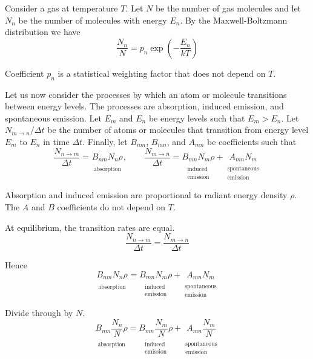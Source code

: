 \documentclass[12pt]{article}
\newcommand\BNM{B_{nm}} %
\newcommand\BMN{B_{mn}} %
\newcommand\AMN{A_{mn}} %
\newcommand\RHO{\rho}
\newcommand\ABSORPTION{\substack{\\[1ex] \text{absorption}}}
\newcommand\INDUCED{\substack{\\[1ex] \text{induced}\\ \text{emission}}}
\newcommand\SPONTANEOUS{\substack{\\[1ex] \text{spontaneous}\\ \text{emission}}}
\begin{document}

Consider a gas at temperature $T$.
Let $N$ be the number of gas molecules
and let $N_n$ be the number of molecules with energy $E_n$.
By the Maxwell-Boltzmann distribution we have
\begin{equation*}
\frac{N_n}{N}=p_n\exp\left(-\frac{E_n}{kT}\right)
\tag{1}
\end{equation*}

\noindent
Coefficient $p_n$ is a statistical weighting factor that does not depend on $T$.

\bigskip
\noindent
Let us now consider the processes by which an atom or molecule transitions between energy levels.
The processes are absorption, induced emission, and spontaneous emission.
Let $E_m$ and $E_n$ be energy levels such that $E_m>E_n$.
Let $N_{m\rightarrow n}/\Delta t$ be the number of atoms or molecules that transition from energy level $E_m$ to $E_n$ in time $\Delta t$.
Finally, let $\BNM$, $\BMN$, and $\AMN$ be coefficients such that
\begin{equation*}
\frac{N_{n\rightarrow m}}{\Delta t}
=\underset{\ABSORPTION}{\BNM N_n \RHO},
\qquad
\frac{N_{m\rightarrow n}}{\Delta t}
=\underset{\INDUCED}{\BMN N_m \RHO}
+
\underset{\SPONTANEOUS}{\AMN N_m}
\end{equation*}

\noindent
Absorption and induced emission are proportional to radiant energy density $\rho$.
The $A$ and $B$ coefficients do not depend on $T$.

\bigskip
\noindent
At equilibrium, the transition rates are equal.
\begin{equation*}
\frac{N_{n\rightarrow m}}{\Delta t}=\frac{N_{m\rightarrow n}}{\Delta t}
\end{equation*}

\noindent
Hence
\begin{equation*}
\underset{\ABSORPTION}{\BNM N_n \RHO}
=\underset{\INDUCED}{\BMN N_m \RHO}
+\underset{\SPONTANEOUS}{\AMN N_m}
\end{equation*}

\noindent
Divide through by $N$.
\begin{equation*}
\underset{\ABSORPTION}{\BNM \frac{N_n}{N} \RHO}
=\underset{\INDUCED}{\BMN \frac{N_m}{N} \RHO}
+\underset{\SPONTANEOUS}{\AMN \frac{N_m}{N}}
\end{equation*}
\end{document}
